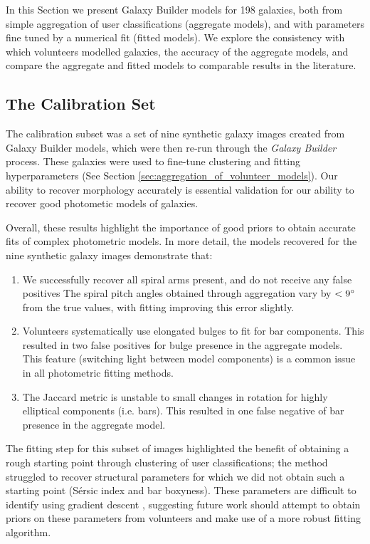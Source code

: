 \documentclass[../main.tex]{subfiles}
\begin{document}
\label{sec:results}

In this Section we present Galaxy Builder models for 198 galaxies, both from simple aggregation of user classifications (aggregate models), and with parameters fine tuned by a numerical fit (fitted models). We explore the consistency with which volunteers modelled galaxies, the accuracy of the aggregate models, and compare the aggregate and fitted models to comparable results in the literature.

\subsection{The Calibration Set}

The calibration subset was a set of nine synthetic galaxy images created from Galaxy Builder models, which were then re-run through the \textit{Galaxy Builder} process. These galaxies were used to fine-tune clustering and fitting hyperparameters (See Section \ref{sec:aggregation_of_volunteer_models}). Our ability to recover morphology accurately is essential validation for our ability to recover good photometic models of galaxies.

Overall, these results highlight the importance of good priors to obtain accurate fits of complex photometric models. In more detail, the models recovered for the nine synthetic galaxy images demonstrate that:

\begin{enumerate}
  \item We successfully recover all spiral arms present, and do not receive any false positives
The spiral pitch angles obtained through aggregation vary by $< 9\degree$ from the true values, with fitting improving this error slightly.
  \item Volunteers systematically use elongated bulges to fit for bar components. This resulted in two false positives for bulge presence in the aggregate models. This feature (switching light between model components) is a common issue in all photometric fitting methods.
  \item The Jaccard metric is unstable to small changes in rotation for highly elliptical components (i.e. bars). This resulted in one false negative of bar presence in the aggregate model.
\end{enumerate}

The fitting step for this subset of images highlighted the benefit of obtaining a rough starting point through clustering of user classifications; the method struggled to recover structural parameters for which we did not obtain such a starting point (S\'ersic index and bar boxyness). These parameters are difficult to identify using gradient descent \citep{2012MNRAS.421.2277L}, suggesting future work should attempt to obtain priors on these parameters from volunteers and make use of a more robust fitting algorithm.
\end{document}
